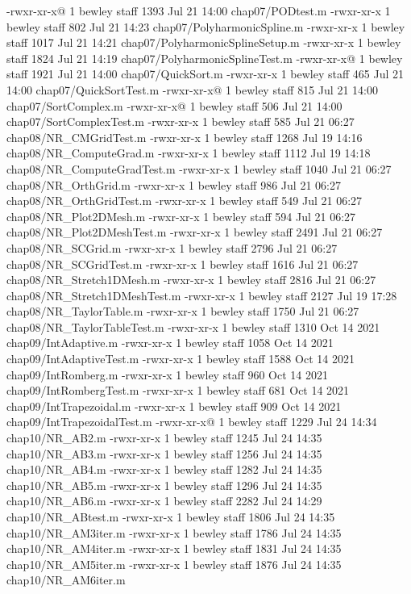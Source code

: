 -rwxr-xr-x@ 1 bewley  staff   1393 Jul 21 14:00 chap07/PODtest.m
-rwxr-xr-x  1 bewley  staff    802 Jul 21 14:23 chap07/PolyharmonicSpline.m
-rwxr-xr-x  1 bewley  staff   1017 Jul 21 14:21 chap07/PolyharmonicSplineSetup.m
-rwxr-xr-x  1 bewley  staff   1824 Jul 21 14:19 chap07/PolyharmonicSplineTest.m
-rwxr-xr-x@ 1 bewley  staff   1921 Jul 21 14:00 chap07/QuickSort.m
-rwxr-xr-x  1 bewley  staff    465 Jul 21 14:00 chap07/QuickSortTest.m
-rwxr-xr-x@ 1 bewley  staff    815 Jul 21 14:00 chap07/SortComplex.m
-rwxr-xr-x@ 1 bewley  staff    506 Jul 21 14:00 chap07/SortComplexTest.m
-rwxr-xr-x  1 bewley  staff    585 Jul 21 06:27 chap08/NR_CMGridTest.m
-rwxr-xr-x  1 bewley  staff   1268 Jul 19 14:16 chap08/NR_ComputeGrad.m
-rwxr-xr-x  1 bewley  staff   1112 Jul 19 14:18 chap08/NR_ComputeGradTest.m
-rwxr-xr-x  1 bewley  staff   1040 Jul 21 06:27 chap08/NR_OrthGrid.m
-rwxr-xr-x  1 bewley  staff    986 Jul 21 06:27 chap08/NR_OrthGridTest.m
-rwxr-xr-x  1 bewley  staff    549 Jul 21 06:27 chap08/NR_Plot2DMesh.m
-rwxr-xr-x  1 bewley  staff    594 Jul 21 06:27 chap08/NR_Plot2DMeshTest.m
-rwxr-xr-x  1 bewley  staff   2491 Jul 21 06:27 chap08/NR_SCGrid.m
-rwxr-xr-x  1 bewley  staff   2796 Jul 21 06:27 chap08/NR_SCGridTest.m
-rwxr-xr-x  1 bewley  staff   1616 Jul 21 06:27 chap08/NR_Stretch1DMesh.m
-rwxr-xr-x  1 bewley  staff   2816 Jul 21 06:27 chap08/NR_Stretch1DMeshTest.m
-rwxr-xr-x  1 bewley  staff   2127 Jul 19 17:28 chap08/NR_TaylorTable.m
-rwxr-xr-x  1 bewley  staff   1750 Jul 21 06:27 chap08/NR_TaylorTableTest.m
-rwxr-xr-x  1 bewley  staff   1310 Oct 14  2021 chap09/IntAdaptive.m
-rwxr-xr-x  1 bewley  staff   1058 Oct 14  2021 chap09/IntAdaptiveTest.m
-rwxr-xr-x  1 bewley  staff   1588 Oct 14  2021 chap09/IntRomberg.m
-rwxr-xr-x  1 bewley  staff    960 Oct 14  2021 chap09/IntRombergTest.m
-rwxr-xr-x  1 bewley  staff    681 Oct 14  2021 chap09/IntTrapezoidal.m
-rwxr-xr-x  1 bewley  staff    909 Oct 14  2021 chap09/IntTrapezoidalTest.m
-rwxr-xr-x@ 1 bewley  staff   1229 Jul 24 14:34 chap10/NR_AB2.m
-rwxr-xr-x  1 bewley  staff   1245 Jul 24 14:35 chap10/NR_AB3.m
-rwxr-xr-x  1 bewley  staff   1256 Jul 24 14:35 chap10/NR_AB4.m
-rwxr-xr-x  1 bewley  staff   1282 Jul 24 14:35 chap10/NR_AB5.m
-rwxr-xr-x  1 bewley  staff   1296 Jul 24 14:35 chap10/NR_AB6.m
-rwxr-xr-x  1 bewley  staff   2282 Jul 24 14:29 chap10/NR_ABtest.m
-rwxr-xr-x  1 bewley  staff   1806 Jul 24 14:35 chap10/NR_AM3iter.m
-rwxr-xr-x  1 bewley  staff   1786 Jul 24 14:35 chap10/NR_AM4iter.m
-rwxr-xr-x  1 bewley  staff   1831 Jul 24 14:35 chap10/NR_AM5iter.m
-rwxr-xr-x  1 bewley  staff   1876 Jul 24 14:35 chap10/NR_AM6iter.m
